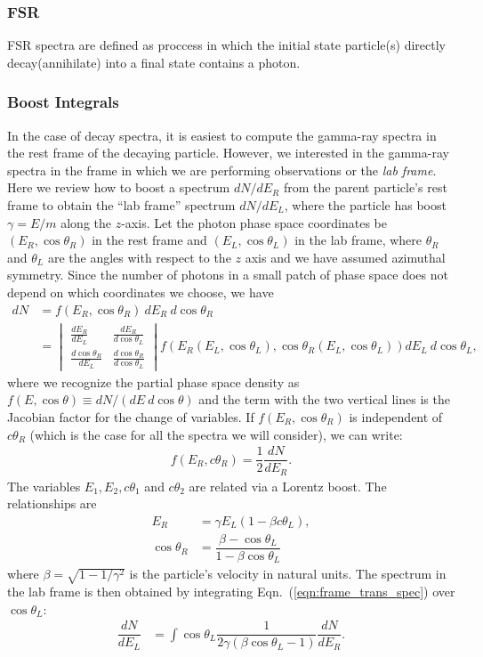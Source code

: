 \documentclass[review]{elsarticle}
\begin{document}
\subsubsection{FSR}
FSR spectra are defined as proccess in which the initial state particle(s) directly decay(annihilate) into a final state contains a photon.

\subsubsection{Boost Integrals}
In the case of decay spectra, it is easiest to compute the gamma-ray spectra in the rest frame of the decaying particle. However, we interested in the gamma-ray spectra in the frame in which we are performing observations or the \textit{lab frame}. Here we review how to boost a spectrum $dN/dE_R$ from the parent particle's rest frame to obtain the ``lab frame'' spectrum $dN/dE_L$, where the particle has boost $\gamma = E / m$ along the $z$-axis. Let the photon phase space coordinates be $(E_R, \cos\theta_R)$ in the rest frame and $(E_L, \cos\theta_L)$ in the lab frame, where $\theta_R$ and $\theta_L$ are the angles with respect to the $z$ axis and we have assumed azimuthal symmetry. Since the number of photons in a small patch of phase space does not depend on which coordinates we choose, we have
\begin{align}\label{eqn:frame_trans_spec}
    dN &= f(E_R, \cos \theta_R)\ dE_R\ d\cos\theta_R\\
       &= \begin{vmatrix}
            \frac{dE_R}{dE_L} & \frac{dE_R}{d\cos\theta_L}\\
            \frac{d\cos\theta_R}{dE_L} & \frac{d\cos\theta_R}{d\cos\theta_L}
        \end{vmatrix} f(E_R(E_L, \cos\theta_L), \cos\theta_R(E_L, \cos\theta_L)) dE_L\ d\cos\theta_L,
\end{align}
where we recognize the partial phase space density as $f(E, \cos\theta) \equiv dN/(dE\ d\cos\theta)$ and the term with the two vertical lines is the Jacobian factor for the change of variables. If \(f(E_R, \cos\theta_R)\) is independent of \(c\theta_R\) (which is the case for all the spectra we will consider), we can write:
\begin{align}
  f(E_{R}, c\theta_{R}) = \dfrac{1}{2}\dfrac{dN}{dE_{R}}.
\end{align}
The variables \(E_{1}, E_{2}, c\theta_{1}\) and \(c\theta_{2}\) are related via a Lorentz boost. The relationships are
\begin{align}
  E_R &= \gamma E_L (1 - \beta c\theta_L),\\
  \cos\theta_R &= \dfrac{\beta - \cos\theta_L}{1 - \beta \cos\theta_L}
\end{align}
where \(\beta = \sqrt{1 - 1 / \gamma^2}\) is the particle's velocity in natural units. The spectrum in the lab frame is then obtained by integrating Eqn.~(\ref{eqn:frame_trans_spec}) over \(\cos\theta_L\):
\begin{align}\label{eq:spec_boost}
  \dfrac{dN}{dE_L} & = \int \cos\theta_L\dfrac{1}{2\gamma(\beta \cos\theta_L - 1)}\dfrac{dN}{dE_R}.
\end{align}
\end{document}
